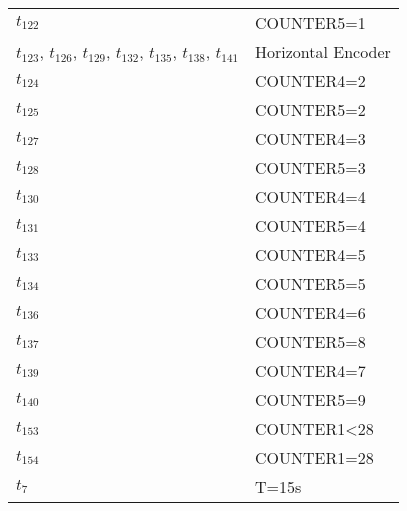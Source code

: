 \begin{longtable}{m{5cm}m{5cm}}
\hyperlink{completeNet:t122}{\hypertarget{completeTable:t122}{$t_{122}$}} & COUNTER5=1\\
\hyperlink{completeNet:t123}{\hypertarget{completeTable:t123}{$t_{123}$}}, \hyperlink{completeNet:t126}{\hypertarget{completeTable:t126}{$t_{126}$}}, \hyperlink{completeNet:t129}{\hypertarget{completeTable:t129}{$t_{129}$}}, \hyperlink{completeNet:t132}{\hypertarget{completeTable:t132}{$t_{132}$}}, \hyperlink{completeNet:t135}{\hypertarget{completeTable:t135}{$t_{135}$}}, \hyperlink{completeNet:t138}{\hypertarget{completeTable:t138}{$t_{138}$}}, \hyperlink{completeNet:t141}{\hypertarget{completeTable:t141}{$t_{141}$}} & Horizontal Encoder\\
\hyperlink{completeNet:t124}{\hypertarget{completeTable:t124}{$t_{124}$}} & COUNTER4=2\\
\hyperlink{completeNet:t125}{\hypertarget{completeTable:t125}{$t_{125}$}} & COUNTER5=2\\
\hyperlink{completeNet:t127}{\hypertarget{completeTable:t127}{$t_{127}$}} & COUNTER4=3\\
\hyperlink{completeNet:t128}{\hypertarget{completeTable:t128}{$t_{128}$}} & COUNTER5=3\\
\hyperlink{completeNet:t130}{\hypertarget{completeTable:t130}{$t_{130}$}} & COUNTER4=4\\
\hyperlink{completeNet:t131}{\hypertarget{completeTable:t131}{$t_{131}$}} & COUNTER5=4\\
\hyperlink{completeNet:t133}{\hypertarget{completeTable:t133}{$t_{133}$}} & COUNTER4=5\\
\hyperlink{completeNet:t134}{\hypertarget{completeTable:t134}{$t_{134}$}} & COUNTER5=5\\
\hyperlink{completeNet:t136}{\hypertarget{completeTable:t136}{$t_{136}$}} & COUNTER4=6\\
\hyperlink{completeNet:t137}{\hypertarget{completeTable:t137}{$t_{137}$}} & COUNTER5=8\\
\hyperlink{completeNet:t139}{\hypertarget{completeTable:t139}{$t_{139}$}} & COUNTER4=7\\
\hyperlink{completeNet:t140}{\hypertarget{completeTable:t140}{$t_{140}$}} & COUNTER5=9\\
\hyperlink{completeNet:t153}{\hypertarget{completeTable:t153}{$t_{153}$}} & COUNTER1<28\\
\hyperlink{completeNet:t154}{\hypertarget{completeTable:t154}{$t_{154}$}} & COUNTER1=28\\
\hyperlink{completeNet:tt7}{\hypertarget{completeTable:tt7}{$t_{7}$}} & T=15s\\

\end{longtable}
